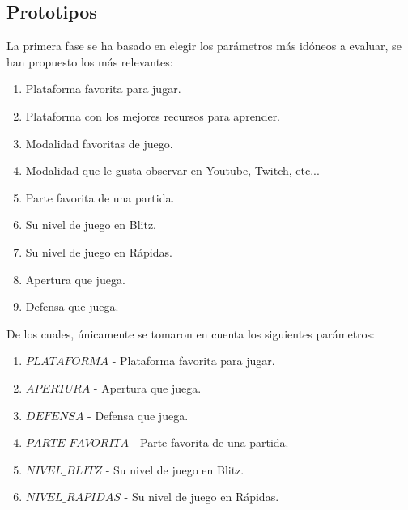 \subsection{Prototipos}
La primera fase se ha basado en elegir los parámetros más idóneos a evaluar, se han propuesto los más relevantes: 

\begin{enumerate}
    \item Plataforma favorita para jugar. 
    \item Plataforma con los mejores recursos para aprender. 
    \item Modalidad favoritas de juego. 
    \item Modalidad que le gusta observar en Youtube, Twitch, etc... 
    \item Parte favorita de una partida. 
    \item Su nivel de juego en Blitz.
    \item Su nivel de juego en Rápidas.
    \item Apertura que juega.
    \item Defensa que juega.
\end{enumerate}

De los cuales, únicamente se tomaron en cuenta los siguientes parámetros: 

\begin{enumerate}
    \item $PLATAFORMA$ - Plataforma favorita para jugar. 
    \item $APERTURA$ - Apertura que juega.
    \item $DEFENSA$ - Defensa que juega.
    \item $PARTE\_ FAVORITA$ - Parte favorita de una partida. 
    \item $NIVEL\_BLITZ$ - Su nivel de juego en Blitz.
    \item $NIVEL\_RAPIDAS$ - Su nivel de juego en Rápidas. 
\end{enumerate}
